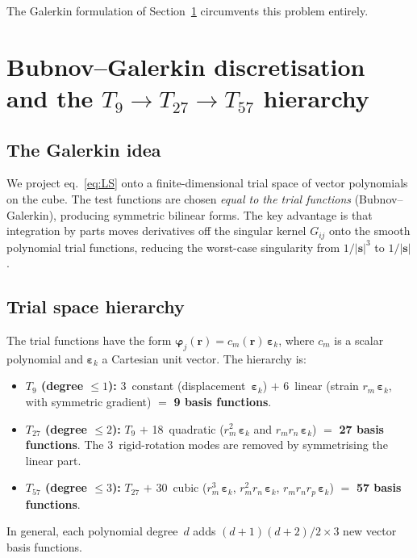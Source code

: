 \documentclass[11pt,a4paper]{article}
\newcommand{\bs}{\bm{s}}
\newcommand{\br}{\bm{r}}
\newcommand{\be}{\bm{\varepsilon}}
\newcommand{\bphi}{\bm{\varphi}}
\theoremstyle{plain}
\theoremstyle{definition}
\theoremstyle{remark}
\begin{document}
The Galerkin formulation of Section~\ref{sec:galerkin} circumvents
this problem entirely.


\section{Bubnov--Galerkin discretisation and the $T_9 \to T_{27}
\to T_{57}$ hierarchy}
\label{sec:galerkin}

\subsection{The Galerkin idea}

We project eq.~\eqref{eq:LS} onto a finite-dimensional trial space
of vector polynomials on the cube.  The test functions are chosen
\emph{equal to the trial functions} (Bubnov--Galerkin), producing
symmetric bilinear forms.  The key advantage is that integration by
parts moves derivatives off the singular kernel $G_{ij}$ onto the
smooth polynomial trial functions, reducing the worst-case singularity
from $1/|\bs|^3$ to $1/|\bs|$.

\subsection{Trial space hierarchy}

The trial functions have the form $\bphi_j(\br) = c_m(\br)\,\be_k$,
where $c_m$ is a scalar polynomial and $\be_k$ a Cartesian unit
vector.  The hierarchy is:
\begin{itemize}
  \item \textbf{$T_9$ (degree $\le 1$):} 3~constant
    (displacement~$\be_k$) $+$ 6~linear (strain $r_m\,\be_k$, with
    symmetric gradient) $=$ \textbf{9 basis functions}.
  \item \textbf{$T_{27}$ (degree $\le 2$):} $T_9$ $+$
    18~quadratic ($r_m^2\,\be_k$ and $r_m r_n\,\be_k$) $=$
    \textbf{27 basis functions}.  The 3~rigid-rotation modes are
    removed by symmetrising the linear part.
  \item \textbf{$T_{57}$ (degree $\le 3$):} $T_{27}$ $+$
    30~cubic ($r_m^3\,\be_k$, $r_m^2 r_n\,\be_k$,
    $r_m r_n r_p\,\be_k$) $=$ \textbf{57 basis functions}.
\end{itemize}
In general, each polynomial degree~$d$ adds $(d+1)(d+2)/2 \times 3$
new vector basis functions.
\end{document}
